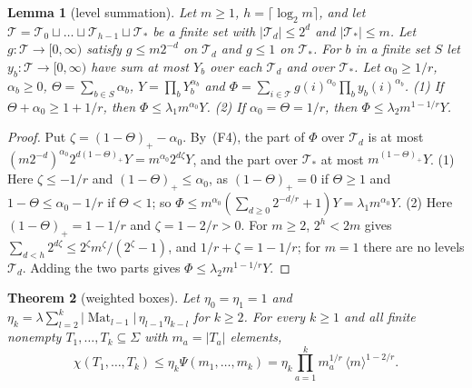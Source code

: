 \documentclass[11pt]{amsart}
\newtheorem{theorem}{Theorem}[section]
\newtheorem{lemma}[theorem]{Lemma}
\theoremstyle{definition}
\theoremstyle{remark}
\numberwithin{equation}{section}
\newcommand{\abs}[1]{\lvert #1\rvert}
\theoremstyle{plain}
\theoremstyle{definition}
\theoremstyle{plain}
\begin{document}
\begin{lemma}[level summation]\label{ord:lem:level-sum}
Let $m\ge1$, $h=\lceil\log_2m\rceil$, and let $\mathcal T=\mathcal T_0\sqcup\dots\sqcup\mathcal T_{h-1}\sqcup\mathcal T_\ast$
be a finite set with $\abs{\mathcal T_d}\le2^d$ and $\abs{\mathcal T_\ast}\le m$. Let $g\colon\mathcal T\to[0,\infty)$
satisfy $g\le m2^{-d}$ on $\mathcal T_d$ and $g\le1$ on $\mathcal T_\ast$. For $b$ in a finite set $S$ let
$y_b\colon\mathcal T\to[0,\infty)$ have sum at most $Y_b$ over each $\mathcal T_d$ and over $\mathcal T_\ast$. Let
$\alpha_0\ge1/r$, $\alpha_b\ge0$, $\Theta=\sum_{b\in S}\alpha_b$, $Y=\prod_bY_b^{\alpha_b}$ and
$\Phi=\sum_{i\in\mathcal T}g(i)^{\alpha_0}\prod_by_b(i)^{\alpha_b}$.
\textup{(1)} If $\Theta+\alpha_0\ge1+1/r$, then $\Phi\le\lambda_1m^{\alpha_0}Y$.
\textup{(2)} If $\alpha_0=\Theta=1/r$, then $\Phi\le\lambda_2m^{1-1/r}Y$.
\end{lemma}

\begin{proof}
Put $\zeta=(1-\Theta)_+-\alpha_0$. By~(F4), the part of $\Phi$ over $\mathcal T_d$ is at most
$(m2^{-d})^{\alpha_0}2^{d(1-\Theta)_+}Y=m^{\alpha_0}2^{d\zeta}Y$, and the part over $\mathcal T_\ast$ at most
$m^{(1-\Theta)_+}Y$. (1) Here $\zeta\le-1/r$ and $(1-\Theta)_+\le\alpha_0$, as $(1-\Theta)_+=0$ if $\Theta\ge1$ and
$1-\Theta\le\alpha_0-1/r$ if $\Theta<1$; so $\Phi\le m^{\alpha_0}(\sum_{d\ge0}2^{-d/r}+1)Y=\lambda_1m^{\alpha_0}Y$.
(2) Here $(1-\Theta)_+=1-1/r$ and $\zeta=1-2/r>0$. For $m\ge2$, $2^h<2m$ gives
$\sum_{d<h}2^{d\zeta}\le2^\zeta m^\zeta/(2^\zeta-1)$, and $1/r+\zeta=1-1/r$; for $m=1$ there are no levels
$\mathcal T_d$. Adding the two parts gives $\Phi\le\lambda_2m^{1-1/r}Y$.
\end{proof}

\begin{theorem}[weighted boxes]\label{ord:thm:weighted-box}
Let $\eta_0=\eta_1=1$ and $\eta_k=\lambda\sum_{l=2}^k\abs{\operatorname{Mat}_{l-1}}\,\eta_{l-1}\eta_{k-l}$ for $k\ge2$.
For every $k\ge1$ and all finite nonempty $T_1,\dots,T_k\subseteq\Sigma$ with $m_a=\abs{T_a}$ elements,
\[
 \chi(T_1,\dots,T_k)\le\eta_k\Psi(m_1,\dots,m_k)=\eta_k\prod_{a=1}^km_a^{1/r}\,\langle m\rangle^{1-2/r}.
\]
\end{theorem}
\end{document}
